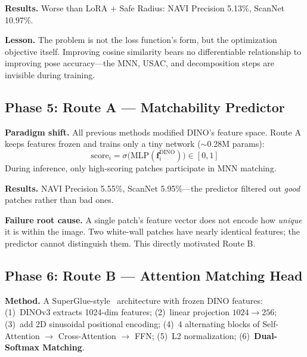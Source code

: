 \documentclass[11pt,a4paper]{article}
\begin{document}
\textbf{Results.} Worse than LoRA + Safe Radius: NAVI Precision 5.13\%, ScanNet 10.97\%.

\textbf{Lesson.} The problem is not the loss function's form, but the optimization objective itself. Improving cosine similarity bears no differentiable relationship to improving pose accuracy---the MNN, USAC, and decomposition steps are invisible during training.

\begin{center}
\end{center}

\subsection{Phase 5: Route A --- Matchability Predictor}

\textbf{Paradigm shift.} All previous methods modified DINO's feature space. Route A keeps features frozen and trains only a tiny network ($\sim$0.28M params):
\begin{equation}
\text{score}_i = \sigma\bigl(\text{MLP}(\mathbf{f}_i^{\text{DINO}})\bigr) \in [0, 1]
\end{equation}
During inference, only high-scoring patches participate in MNN matching.

\textbf{Results.} NAVI Precision 5.55\%, ScanNet 5.95\%---the predictor filtered out \emph{good} patches rather than bad ones.

\textbf{Failure root cause.} A single patch's feature vector does not encode how \emph{unique} it is within the image. Two white-wall patches have nearly identical features; the predictor cannot distinguish them. This directly motivated Route B.

\subsection{Phase 6: Route B --- Attention Matching Head}

\textbf{Method.} A SuperGlue-style~\cite{superglue} architecture with frozen DINO features: (1)~DINOv3 extracts 1024-dim features; (2)~linear projection $1024\rightarrow256$; (3)~add 2D sinusoidal positional encoding; (4)~4 alternating blocks of Self-Attention $\rightarrow$ Cross-Attention $\rightarrow$ FFN; (5)~L2 normalization; (6)~\textbf{Dual-Softmax Matching}.
\end{document}
